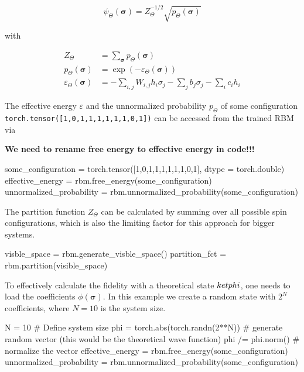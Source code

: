 \documentclass[submission, Phys]{SciPost}
\begin{document}
\begin{equation}
\psi_{\Theta}(\bm{\sigma}) = Z_{\Theta}^{-1/2} \sqrt{p_{\Theta} (\bm{\sigma})}
\end{equation}

with

\begin{align}
Z_{\Theta} &= \sum_{\bm{\sigma}} p_{\Theta}(\bm{\sigma}) \\
p_{\Theta} (\bm{\sigma}) &= \exp{ (- \varepsilon_{\Theta} (\bm{\sigma}))} \\
\varepsilon_{\Theta} (\bm{\sigma}) &= -\sum_{i,j} W_{i,j} h_i \sigma_j - \sum_j b_j \sigma_j - \sum_i c_i h_i
\end{align}


The effective energy $\varepsilon$ and the unnormalized probability $p_{\Theta}$ of some configuration 
\verb|torch.tensor([1,0,1,1,1,1,1,1,0,1])| can be accessed from the trained RBM via

\textbf{We need to rename free energy to effective energy in code!!!}

\begin{python}
some_configuration = torch.tensor([1,0,1,1,1,1,1,1,0,1], dtype = torch.double)
effective_energy = rbm.free_energy(some_configuration)
unnormalized_probability = rbm.unnormalized_probability(some_configuration) 
\end{python}

The partition function $Z_{\Theta}$ can be calculated by summing over all possible spin configurations, which is also the limiting factor for this approach for bigger systems.

\begin{python}
visble_space = rbm.generate_visble_space()
partition_fct = rbm.partition(visible_space)
\end{python}

To effectively calculate the fidelity with a theoretical state $\\ket{phi}$, one needs to load the coefficients $\phi(\bm{\sigma})$. In this example we create a random state with $2^N$ coefficients, where $N=10$ is the system size.

\begin{python}
N = 10 # Define system size
phi =  torch.abs(torch.randn(2**N)) # generate random vector (this would be the theoretical wave function)
phi /= phi.norm() # normalize the vector
effective_energy = rbm.free_energy(some_configuration)
unnormalized_probability = rbm.unnormalized_probability(some_configuration) 
\end{python}
\end{document}
